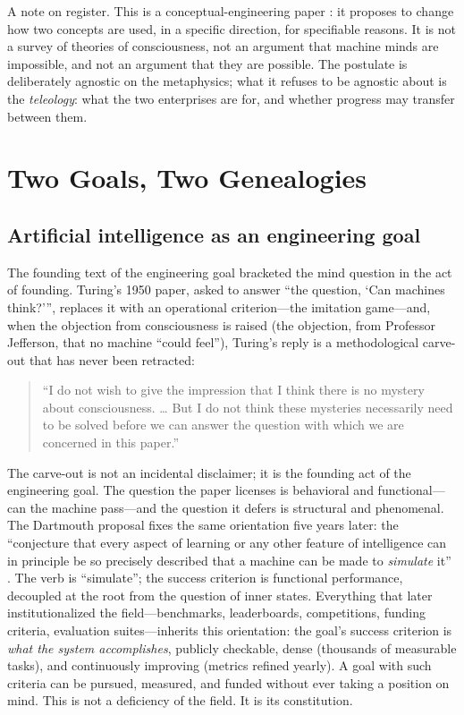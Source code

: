 \documentclass[10pt]{article}
\begin{document}
A note on register. This is a conceptual-engineering paper \cite{cappelen2018fixing}: it proposes to change how two concepts are used, in a specific direction, for specifiable reasons. It is not a survey of theories of consciousness, not an argument that machine minds are impossible, and not an argument that they are possible. The postulate is deliberately agnostic on the metaphysics; what it refuses to be agnostic about is the \emph{teleology}: what the two enterprises are for, and whether progress may transfer between them.

\section{Two Goals, Two Genealogies}\label{sec:genealogy}

\subsection{Artificial intelligence as an engineering goal}\label{sec:genealogyai}

The founding text of the engineering goal bracketed the mind question in the act of founding. Turing's 1950 paper, asked to answer ``the question, `Can machines think?''', replaces it with an operational criterion---the imitation game---and, when the objection from consciousness is raised (the objection, from Professor Jefferson, that no machine ``could feel''), Turing's reply is a methodological carve-out that has never been retracted:

\begin{quote}``I do not wish to give the impression that I think there is no mystery about consciousness. \dots{} But I do not think these mysteries necessarily need to be solved before we can answer the question with which we are concerned in this paper.''\end{quote}

The carve-out is not an incidental disclaimer; it is the founding act of the engineering goal. The question the paper licenses is behavioral and functional---can the machine pass---and the question it defers is structural and phenomenal. The Dartmouth proposal fixes the same orientation five years later: the ``conjecture that every aspect of learning or any other feature of intelligence can in principle be so precisely described that a machine can be made to \emph{simulate} it'' \cite{mccarthy1955proposal}. The verb is ``simulate''; the success criterion is functional performance, decoupled at the root from the question of inner states. Everything that later institutionalized the field---benchmarks, leaderboards, competitions, funding criteria, evaluation suites---inherits this orientation: the goal's success criterion is \emph{what the system accomplishes}, publicly checkable, dense (thousands of measurable tasks), and continuously improving (metrics refined yearly). A goal with such criteria can be pursued, measured, and funded without ever taking a position on mind. This is not a deficiency of the field. It is its constitution.
\end{document}
